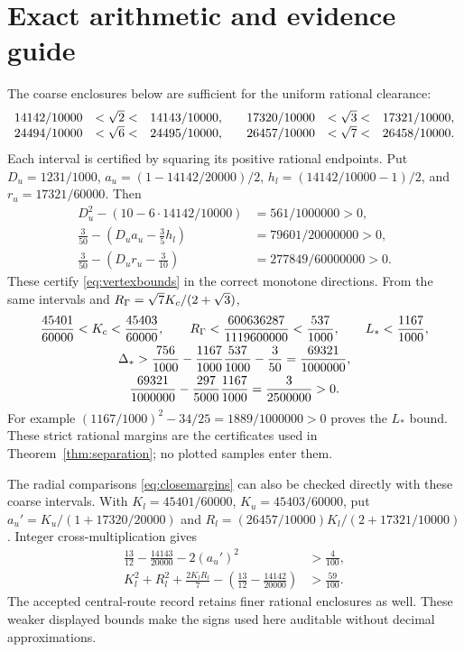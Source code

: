 \section{Exact arithmetic and evidence guide}\label{sec:arithmetic}
The coarse enclosures below are sufficient for the uniform rational clearance:
\begin{equation}\label{eq:radicalintervals}
 \begin{array}{rcl@{\qquad}rcl}
 14142/10000&<\sqrt2<&14143/10000,&17320/10000&<\sqrt3<&17321/10000,\\
 24494/10000&<\sqrt6<&24495/10000,&26457/10000&<\sqrt7<&26458/10000.
 \end{array}
\end{equation}
Each interval is certified by squaring its positive rational endpoints. Put $D_u=1231/1000$, $a_u=(1-14142/20000)/2$, $h_l=(14142/10000-1)/2$, and $r_u=17321/60000$. Then
\begin{equation}\label{eq:vertexcertificate}
 \begin{aligned}
 D_u^2-(10-6\cdot14142/10000)&=561/1000000>0,\\
 \frac3{50}-(D_ua_u-\tfrac35h_l)&=79601/20000000>0,\\
 \frac3{50}-(D_ur_u-\tfrac3{10})&=277849/60000000>0.
 \end{aligned}
\end{equation}
These certify \eqref{eq:vertexbounds} in the correct monotone directions. From the same intervals and $R_\Gamma=\sqrt7K_c/(2+\sqrt3)$,
\begin{equation}\label{eq:gapcertificate}
 \begin{gathered}
 \frac{45401}{60000}<K_c<\frac{45403}{60000},\qquad
 R_\Gamma<\frac{600636287}{1119600000}<\frac{537}{1000},\qquad
 L_*<\frac{1167}{1000},\\
 \Delta_* >\frac{756}{1000}-\frac{1167}{1000}\frac{537}{1000}-\frac3{50}
 =\frac{69321}{1000000},\\
 \frac{69321}{1000000}-\frac{297}{5000}\frac{1167}{1000}
 =\frac3{2500000}>0.
 \end{gathered}
\end{equation}
For example $(1167/1000)^2-34/25=1889/1000000>0$ proves the $L_*$ bound. These strict rational margins are the certificates used in Theorem~\ref{thm:separation}; no plotted samples enter them.

The radial comparisons \eqref{eq:closemargins} can also be checked directly with these coarse intervals. With $K_l=45401/60000$, $K_u=45403/60000$, put $a_u'=K_u/(1+17320/20000)$ and $R_l=(26457/10000)K_l/(2+17321/10000)$. Integer cross-multiplication gives
\begin{equation}\label{eq:radialcertificate}
 \begin{aligned}
 \frac{13}{12}-\frac{14143}{20000}-2(a_u')^2&>\frac4{100},\\
 K_l^2+R_l^2+\frac{2K_lR_l}{7}
 -\left(\frac{13}{12}-\frac{14142}{20000}\right)&>\frac{59}{100}.
 \end{aligned}
\end{equation}
The accepted central-route record retains finer rational enclosures as well. These weaker displayed bounds make the signs used here auditable without decimal approximations.

